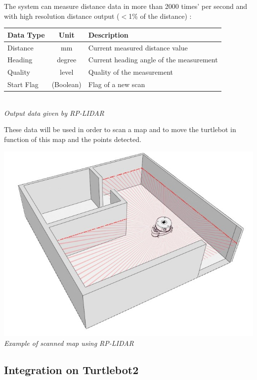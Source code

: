 \documentclass[10pt,a4paper]{article}
\begin{document}
The system can measure distance data in more than 2000 times' per second and with high resolution distance output ($<$1\% of the distance) :\\

\begin{center}
\begin{tabular}{|l|c|l|}
\hline
Data Type & Unit & Description\\
\hline
Distance & mm & Current measured distance value\\
Heading & degree & Current heading angle of the measurement \\
Quality & level & Quality of the measurement\\
Start Flag & 	(Boolean) & Flag of a new scan\\
\hline
\end{tabular}\\

\textit{Output data given by RP-LIDAR}
\end{center}

These data will be used in order to scan a map and to move the turtlebot in function of this map and the points detected. 

\begin{center}
\includegraphics[scale=0.5]{images/RPLIDAR_room.jpg}\\
\textit{Example of scanned map using RP-LIDAR}
\end{center}

\subsection{Integration on Turtlebot2}
\end{document}
